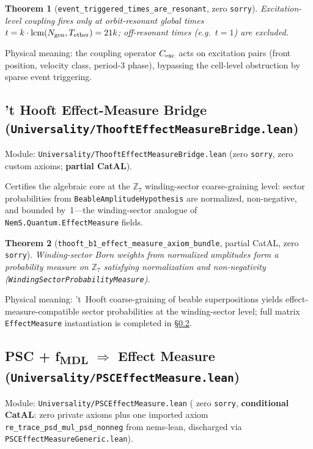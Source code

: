 \documentclass[11pt,a4paper]{article}
\newtheorem{theorem}{Theorem}[section]
\theoremstyle{definition}
\begin{document}
\begin{theorem}[\lstinline|event_triggered_times_are_resonant|, zero \texttt{sorry}]
Excitation-level coupling fires only at orbit-resonant global times
$t = k\cdot\mathrm{lcm}(N_{\rm gen}, T_{\rm ether}) = 21k$; off-resonant
times (e.g.\ $t=1$) are excluded.
\end{theorem}

Physical meaning: the coupling operator $C_{\rm exc}$ acts on excitation pairs
(front position, velocity class, period-3 phase), bypassing the cell-level
obstruction by sparse event triggering.

\subsection{'t Hooft Effect-Measure Bridge\linebreak
  (\texttt{\small Universality/ThooftEffectMeasureBridge.lean})}\label{subsec:thooft-effect-measure}

Module: \texttt{Universality/ThooftEffectMeasureBridge.lean} (zero
\lstinline|sorry|, zero custom axioms; \textbf{partial CatAL}).

Certifies the algebraic core at the $\mathbb{Z}_7$ winding-sector
coarse-graining level: sector probabilities from
\lstinline|BeableAmplitudeHypothesis| are normalized, non-negative, and
bounded by~1---the winding-sector analogue of \texttt{NemS.Quantum.EffectMeasure}
fields.

\begin{theorem}[\lstinline|thooft_b1_effect_measure_axiom_bundle|, partial CatAL, zero \texttt{sorry}]
Winding-sector Born weights from normalized amplitudes form a probability
measure on $\mathbb{Z}_7$ satisfying normalization and non-negativity
(\lstinline|WindingSectorProbabilityMeasure|).
\end{theorem}

Physical meaning: 't~Hooft coarse-graining of beable superpositions yields
effect-measure-compatible sector probabilities at the winding-sector level;
full matrix \texttt{EffectMeasure} instantiation is completed in
\S\ref{subsec:psc-effect-measure}.

\subsection{PSC + f\textsubscript{MDL} $\Rightarrow$ Effect Measure
  (\texttt{Universality/PSCEffectMeasure.lean})}\label{subsec:psc-effect-measure}

Module: \texttt{Universality/PSCEffectMeasure.lean} (
zero \lstinline|sorry|, \textbf{conditional CatAL}: zero private axioms plus
one imported axiom \lstinline|re_trace_psd_mul_psd_nonneg| from nems-lean,
discharged via \texttt{PSCEffectMeasureGeneric.lean}).
\end{document}
